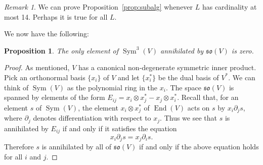 \documentclass{amsart}
\newtheorem{proposition}[theorem]{Proposition}
\theoremstyle{definition}
\theoremstyle{remark}
\newtheorem{remark}[theorem]{\it Remark}
\DeclareMathOperator{\Sym}{Sym}
\DeclareMathOperator{\End}{End}
\let\mf\mathfrak
\begin{document}
\begin{remark}
We can prove Proposition~\ref{prop:subalg} whenever $L$ has cardinality at most 14.  Perhaps
it is true for all $L$.
\end{remark}

We now have the following:

\begin{proposition}
\label{prop:so-ann}
The only element of $\Sym^3(V)$ annihilated by $\mf{so}(V)$ is zero.
\end{proposition}

\begin{proof}
As mentioned, $V$ has a canonical non-degenerate symmetric inner product.
Pick an orthonormal basis $\{x_i\}$ of $V$ and let $\{x_i^*\}$ be the dual
basis of $V^*$.  We can think of $\Sym(V)$ as the polynomial ring in the
$x_i$.  The space $\mf{so}(V)$ is spanned by elements of the form
$E_{ij}=x_i \otimes x_j^* - x_j \otimes x_i^*$.   Recall that, for an
element $s$ of $\Sym(V)$, the element $x_i \otimes x_j^*$ of $\End(V)$
acts on $s$ by $x_i \partial_j s$, where $\partial_j$ denotes differentiation
with respect to $x_j$.  Thus we see that $s$ is annihilated by $E_{ij}$ if
and only if it satisfies the equation
\begin{equation}
\label{eq1}
x_i \partial_j s = x_j \partial_i s.
\end{equation}
Therefore $s$ is annihilated by all of $\mf{so}(V)$ if and only if the above
equation holds for all $i$ and $j$.


\end{proof}
\end{document}
